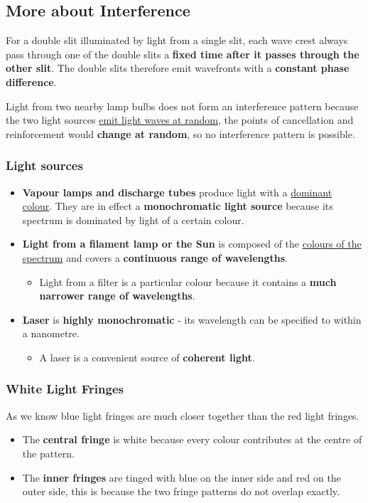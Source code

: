 \subsection{More about Interference}

For a double slit illuminated by light from a single slit, each wave crest always pass through one of the double slits a \textbf{fixed time after it passes through the other slit}. The double slits therefore emit wavefronts with a \textbf{constant phase difference}.

Light from two nearby lamp bulbs does not form an interference pattern because the two light sources \underline{emit light waves at random}, the points of cancellation and reinforcement would \textbf{change at random}, so no interference pattern is possible.

\subsubsection*{Light sources}

\begin{itemize}
    \item \textbf{Vapour lamps and discharge tubes} produce light with a \underline{dominant colour}. They are in effect a \textbf{monochromatic light source} because its spectrum is dominated by light of a certain colour.
    \item \textbf{Light from a filament lamp or the Sun} is composed of the \underline{colours of the spectrum} and covers a \textbf{continuous range of wavelengths}.
        \begin{itemize}
            \item Light from a filter is a particular colour because it contains a \textbf{much narrower range of wavelengths}.
        \end{itemize}
    \item \textbf{Laser} is \textbf{highly monochromatic} - its wavelength can be specified to within a nanometre.
        \begin{itemize}
            \item A laser is a convenient source of \textbf{coherent light}.
        \end{itemize}
\end{itemize}

\subsubsection*{White Light Fringes}
As we know blue light fringes are much closer together than the red light fringes.

\begin{itemize}
    \item The \textbf{central fringe} is white because every colour contributes at the centre of the pattern.
    \item The \textbf{inner fringes} are tinged with blue on the inner side and red on the outer side, this is because the two fringe patterns do not overlap exactly.
\end{itemize}
